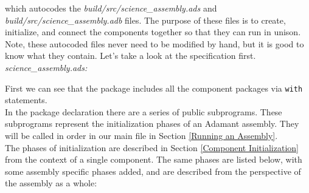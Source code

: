 which autocodes the \textit{build/src/science\_assembly.ads} and \textit{build/src/science\_assembly.adb} files. The purpose of these files is to create, initialize, and connect the components together so that they can run in unison. Note, these autocoded files never need to be modified by hand, but it is good to know what they contain. Let's take a look at the specification first. \\

\textit{science\_assembly.ads:}

First we can see that the package includes all the component packages via \texttt{with} statements. \\

In the package declaration there are a series of public subprograms. These subprograms represent the initialization phases of an Adamant assembly. They will be called in order in our main file in Section \ref{Running an Assembly}. \\

The phases of initialization are described in Section \ref{Component Initialization} from the context of a single component. The same phases are listed below, with some assembly specific phases added, and are described from the perspective of the assembly as a whole:

